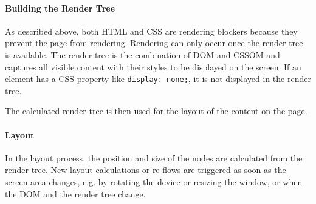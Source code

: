 








\paragraph{Building the Render Tree} %

As described above, both HTML and CSS are rendering blockers because they prevent the page from rendering.
Rendering can only occur once the render tree is available.
The render tree is the combination of DOM and CSSOM and captures all visible content with their styles to be displayed on the screen.
If an element has a CSS property like \verb|display: none;|, it is not displayed in the render tree. %

The calculated render tree is then used for the layout of the content on the page.





\paragraph{Layout} %

In the layout process, the position and size of the nodes are calculated from the render tree.
New layout calculations or re-flows are triggered as soon as the screen area changes, e.g. by rotating the device or resizing the window, or when the DOM and the render tree change. %

